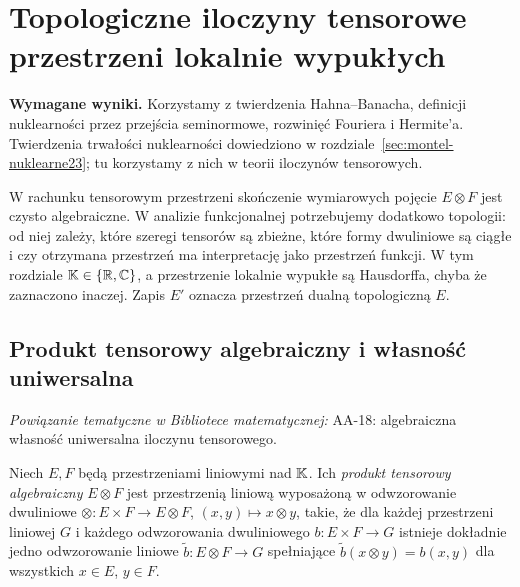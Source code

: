 
\section{Topologiczne iloczyny tensorowe przestrzeni lokalnie wypukłych}
\label{sec:tensor24}

\providecommand{\atlasref}[2]{#2}


\noindent\textbf{Wymagane wyniki.} Korzystamy z twierdzenia
Hahna--Banacha, definicji nuklearności przez przejścia seminormowe,
rozwinięć Fouriera i Hermite'a. Twierdzenia trwałości nuklearności
dowiedziono w rozdziale~\ref{sec:montel-nuklearne23}; tu korzystamy z nich
w teorii iloczynów tensorowych.
\medskip

W rachunku tensorowym przestrzeni skończenie wymiarowych pojęcie
$E\otimes F$ jest czysto algebraiczne. W analizie funkcjonalnej
potrzebujemy dodatkowo topologii: od niej zależy, które szeregi
tensorów są zbieżne, które formy dwuliniowe są ciągłe i czy
otrzymana przestrzeń ma interpretację jako przestrzeń funkcji.
W tym rozdziale $\mathbb K\in\{\mathbb R,\mathbb C\}$, a przestrzenie lokalnie wypukłe
są Hausdorffa, chyba że zaznaczono inaczej. Zapis $E'$ oznacza
przestrzeń dualną topologiczną $E$.

\subsection{Produkt tensorowy algebraiczny i własność uniwersalna}

\noindent\emph{Powiązanie tematyczne w Bibliotece matematycznej:} \atlasref{AA-18::aa:tw:tensor-universal}{AA-18: algebraiczna własność uniwersalna iloczynu tensorowego}.


\begin{definicja}
\label{def:alg-tensor24}
Niech $E,F$ będą przestrzeniami liniowymi nad $\mathbb K$.
Ich \emph{produkt tensorowy algebraiczny} $E\otimes F$ jest
przestrzenią liniową wyposażoną w odwzorowanie dwuliniowe
$\otimes:E\times F\to E\otimes F$, $ (x,y)\mapsto x\otimes y$,
takie, że dla każdej przestrzeni liniowej $G$ i każdego
odwzorowania dwuliniowego $b:E\times F\to G$ istnieje dokładnie
jedno odwzorowanie liniowe $\widetilde b:E\otimes F\to G$
spełniające $\widetilde b(x\otimes y)=b(x,y)$ dla wszystkich
$x\in E$, $y\in F$.
\end{definicja}

